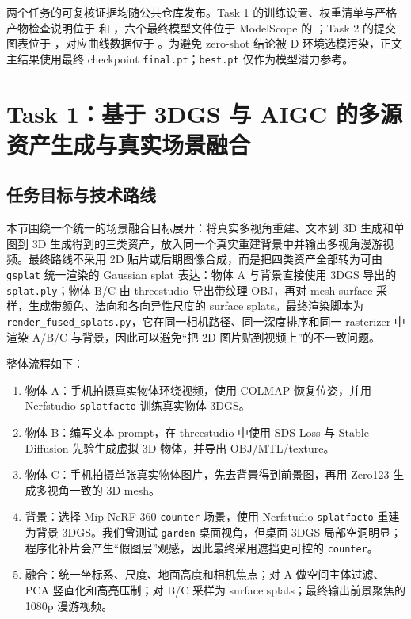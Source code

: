 \documentclass[lang=cn,a4paper,newtx,nofont,code=minted]{elegantpaper}
\begin{document}
两个任务的可复核证据均随公共仓库发布。Task 1 的训练设置、权重清单与严格产物检查说明位于  和 ，六个最终模型文件位于 ModelScope 的 ；Task 2 的提交图表位于 ，对应曲线数据位于 。为避免 zero-shot 结论被 D 环境选模污染，正文主结果使用最终 checkpoint \texttt{final.pt}；\texttt{best.pt} 仅作为模型潜力参考。

\section{Task 1：基于 3DGS 与 AIGC 的多源资产生成与真实场景融合}

\subsection{任务目标与技术路线}

本节围绕一个统一的场景融合目标展开：将真实多视角重建、文本到 3D 生成和单图到 3D 生成得到的三类资产，放入同一个真实重建背景中并输出多视角漫游视频。最终路线不采用 2D 贴片或后期图像合成，而是把四类资产全部转为可由 \texttt{gsplat} 统一渲染的 Gaussian splat 表达：物体 A 与背景直接使用 3DGS 导出的 \texttt{splat.ply}；物体 B/C 由 threestudio 导出带纹理 OBJ，再对 mesh surface 采样，生成带颜色、法向和各向异性尺度的 surface splats。最终渲染脚本为 \texttt{render\_fused\_splats.py}，它在同一相机路径、同一深度排序和同一 rasterizer 中渲染 A/B/C 与背景，因此可以避免“把 2D 图片贴到视频上”的不一致问题。

整体流程如下：
\begin{enumerate}[leftmargin=2em,itemsep=2pt,topsep=2pt]
  \item 物体 A：手机拍摄真实物体环绕视频，使用 COLMAP 恢复位姿，并用 Nerfstudio \texttt{splatfacto} 训练真实物体 3DGS。
  \item 物体 B：编写文本 prompt，在 threestudio 中使用 SDS Loss 与 Stable Diffusion 先验生成虚拟 3D 物体，并导出 OBJ/MTL/texture。
  \item 物体 C：手机拍摄单张真实物体图片，先去背景得到前景图，再用 Zero123 生成多视角一致的 3D mesh。
  \item 背景：选择 Mip-NeRF 360 \texttt{counter} 场景，使用 Nerfstudio \texttt{splatfacto} 重建为背景 3DGS。我们曾测试 \texttt{garden} 桌面视角，但桌面 3DGS 局部空洞明显；程序化补片会产生“假图层”观感，因此最终采用遮挡更可控的 \texttt{counter}。
  \item 融合：统一坐标系、尺度、地面高度和相机焦点；对 A 做空间主体过滤、PCA 竖直化和高亮压制；对 B/C 采样为 surface splats；最终输出前景聚焦的 1080p 漫游视频。
\end{enumerate}
\end{document}
